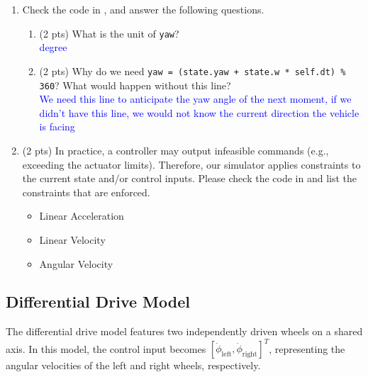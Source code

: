 \documentclass[11pt]{article}
\begin{document}
\begin{enumerate}
    \item \noindent\textbf{\faPen} Check the code in \textcolor{teal}{\texttt{\allowbreak{}}}, and answer the following questions.
          \begin{enumerate}
              \item (2 pts) What is the unit of \texttt{yaw}? \\
                    \textcolor{blue}{degree}
              \item (2 pts) Why do we need \texttt{yaw = (state.yaw + state.w * self.dt) \% 360}? What would happen without this line? \\
                    \textcolor{blue}{We need this line to anticipate the yaw angle of the next moment, if we didn't have this line, we would not know the current direction the vehicle is facing}
          \end{enumerate}

    \item \noindent\textbf{\faPen}  (2 pts) In practice, a controller may output infeasible commands (e.g., exceeding the actuator limits).
          Therefore, our simulator applies constraints to the current state and/or control inputs.
          Please check the code in \textcolor{teal}{\texttt{\allowbreak{}}} and list the constraints that are enforced.
          \begin{itemize}
            \color{blue}
                \item Linear Acceleration
                \item Linear Velocity
                \item Angular Velocity
          \end{itemize}
\end{enumerate}

\subsection{Differential Drive Model}
\noindent The differential drive model features two independently driven wheels on a shared axis. In this model, the control input becomes $[\dot{\phi}_{\mathrm{left}}, \dot{\phi}_{\mathrm{right}}]^T$, representing the angular velocities of the left and right wheels, respectively. \\
\end{document}
